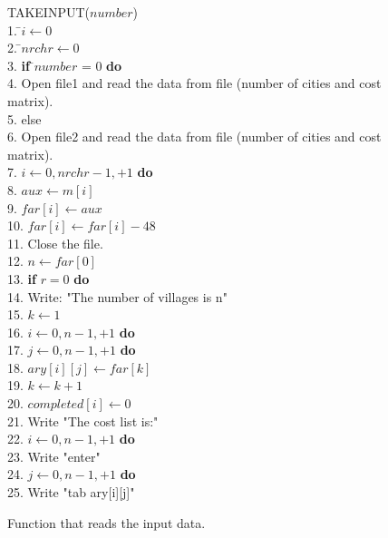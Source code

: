 \documentclass{article}
\begin{document}
    \begin{figure}
\begin{center}
\begin{tabbing}

  TAKEINPUT($number$) \\
1. \indent \=$i \leftarrow 0$
 \\
2. \indent \=$nrchr \leftarrow 0$\\
3. {\bf if} \=$number$ = $0$
{\bf  do}\\

4. \indent \>Open file1 and read the data from file (number of cities and cost matrix).
\\
5.  else \\
6.  \indent \>Open file2 and read the data from file (number of cities and cost matrix).
\\

7.  $i \leftarrow 0, nrchr-1, +1 $
{\bf  do}\\
8. \indent\> $aux \leftarrow m[i]$\\
9.  \indent\> $far[i] \leftarrow aux$\\
10. \indent\>$far[i] \leftarrow far[i]-48$\\
11. Close the file.\\
12. $n \leftarrow far[0] $\\
13. {\bf if} $r = 0$
{\bf do}\\
14.   \indent \> Write: "The number of villages is n"\\
15. \indent $k\leftarrow 1$\\
16.  $i \leftarrow 0, n-1, +1 $
{\bf  do}\\
17.  \indent {} $j\leftarrow 0, n-1, +1 $
{\bf  do}\\
18.   \indent $ary[i][j] \leftarrow far[k]$\\
19.             \indent    $k \leftarrow k+1$\\
20. \indent $completed[i] \leftarrow 0$\\
21. \indent Write "The cost list is:"\\
22.  $i \leftarrow 0, n-1, +1 $
{\bf  do}\\ 
23.   \indent  Write "enter"\\
24.   \indent {} $j\leftarrow 0, n-1, +1 $
{\bf  do}\\
25.  \indent     Write "tab ary[i][j]"\\
\end{tabbing}
\label{fig_alg_ex}
\caption{Function that reads the input data.}

\end{center}
\end{figure}
\end{document}
